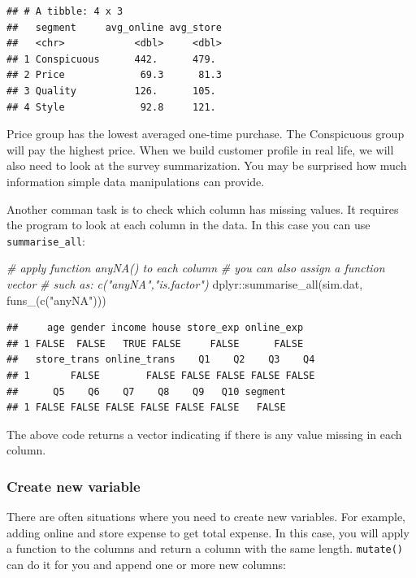 \documentclass[
  12pt,
]{krantz}
\makeatletter
\newenvironment{Shaded}{\begin{snugshade}}{\end{snugshade}}
\newcommand{\CommentTok}[1]{\textcolor[rgb]{0.37,0.37,0.37}{\textit{#1}}}
\newcommand{\FunctionTok}[1]{\textcolor[rgb]{0,0,0}{#1}}
\newcommand{\NormalTok}[1]{#1}
\newcommand{\SpecialCharTok}[1]{\textcolor[rgb]{0,0,0}{#1}}
\newcommand{\StringTok}[1]{\textcolor[rgb]{0.5,0.5,0.5}{#1}}
\newenvironment{kframe}{%
\medskip{}
\setlength{\fboxsep}{.8em}
 \def\at@end@of@kframe{}%
 \ifinner\ifhmode%
  \def\at@end@of@kframe{\end{minipage}}%
  \begin{minipage}{\columnwidth}%
 \fi\fi%
 \def\FrameCommand##1{\hskip\@totalleftmargin \hskip-\fboxsep
 \colorbox{shadecolor}{##1}\hskip-\fboxsep
     \hskip-\linewidth \hskip-\@totalleftmargin \hskip\columnwidth}%
 \MakeFramed {\advance\hsize-\width
   \@totalleftmargin\z@ \linewidth\hsize
   \@setminipage}}%
 {\par\unskip\endMakeFramed%
 \at@end@of@kframe}
\renewenvironment{Shaded}{\begin{kframe}}{\end{kframe}}
\makeatother
\begin{document}
\begin{verbatim}
## # A tibble: 4 x 3
##   segment     avg_online avg_store
##   <chr>            <dbl>     <dbl>
## 1 Conspicuous      442.      479. 
## 2 Price             69.3      81.3
## 3 Quality          126.      105. 
## 4 Style             92.8     121.
\end{verbatim}

Price group has the lowest averaged one-time purchase. The Conspicuous group will pay the highest price. When we build customer profile in real life, we will also need to look at the survey summarization. You may be surprised how much information simple data manipulations can provide.

Another comman task is to check which column has missing values. It requires the program to look at each column in the data. In this case you can use \texttt{summarise\_all}:

\begin{Shaded}
\begin{Highlighting}[]
\CommentTok{\# apply function anyNA() to each column}
\CommentTok{\# you can also assign a function vector }
\CommentTok{\# such as: c("anyNA","is.factor")}
\NormalTok{dplyr}\SpecialCharTok{::}\FunctionTok{summarise\_all}\NormalTok{(sim.dat, }\FunctionTok{funs\_}\NormalTok{(}\FunctionTok{c}\NormalTok{(}\StringTok{"anyNA"}\NormalTok{)))}
\end{Highlighting}
\end{Shaded}

\begin{verbatim}
##     age gender income house store_exp online_exp
## 1 FALSE  FALSE   TRUE FALSE     FALSE      FALSE
##   store_trans online_trans    Q1    Q2    Q3    Q4
## 1       FALSE        FALSE FALSE FALSE FALSE FALSE
##      Q5    Q6    Q7    Q8    Q9   Q10 segment
## 1 FALSE FALSE FALSE FALSE FALSE FALSE   FALSE
\end{verbatim}

The above code returns a vector indicating if there is any value missing in each column.

\hypertarget{create-new-variable}{%
\subsubsection{Create new variable}\label{create-new-variable}}

There are often situations where you need to create new variables. For example, adding online and store expense to get total expense. In this case, you will apply a function to the columns and return a column with the same length. \texttt{mutate()} can do it for you and append one or more new columns:
\end{document}
